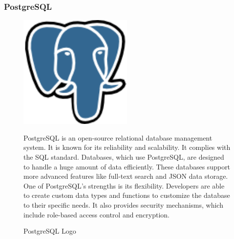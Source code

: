 \subsubsection{PostgreSQL}
\begin{figure}[H]
    \centering
    \begin{minipage}{0.35\textwidth}
        \center
        \includegraphics [width=0.5\textwidth] {images/Technologies/postgresLogo.png}
        \caption{PostgreSQL Logo \autocite{Postgres:Logo}}
    \end{minipage}
    \hfill
    \begin{minipage}{0.6\textwidth}
      \setlength{\baselineskip}{1.5em}
      \vspace{-1em}
      PostgreSQL is an open-source relational database management system. It is known for its reliability and scalability. It complies with the SQL standard. Databases, which use PostgreSQL, are designed to handle a huge amount of data efficiently. These databases support more advanced features like full-text search and JSON data storage. One of PostgreSQL's strengths is its flexibility. Developers are able to create custom data types and functions to customize the database to their specific needs. It also provides security mechanisms, which include role-based access control and encryption. 
    \end{minipage}
\end{figure}

\newpage
